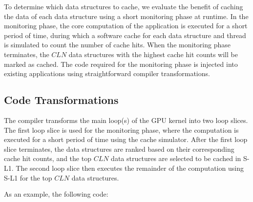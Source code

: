 To determine which data structures to cache, we evaluate the benefit of caching the data of each
data structure using a short monitoring phase at runtime.
In the monitoring phase, the core computation of the application is executed for a short period of
time, during which a software cache for each data structure and thread is simulated to count the number of cache hits.
When the monitoring phase terminates, the $CLN$ data structures with the highest cache hit counts
will be marked as cached. 
The code required for the monitoring phase is injected into existing applications using straightforward
compiler transformations. 




\subsection{Code Transformations}
The compiler transforms the main loop(s) of the GPU kernel into two loop slices. 
The first loop slice is used for the monitoring phase, where the computation is executed for a short
period of time using the cache simulator.
After the first loop slice terminates, the data structures are ranked based on their corresponding
cache hit counts, and the top $CLN$ data structures are selected to be cached in S-L1. 
The second loop slice then executes the remainder of the computation using S-L1 for the top $CLN$
data structures.

As an example, the following code:

{\scriptsize
\begin{flushleft}
\verb%  //Some initialization%
\\ \verb%  for(int i = start; i < end; i ++) {%
\\ \verb%       char a = charInput[i];%
\\ \verb%       int b = intInput[i];%
\\ \verb%   %
\\ \verb%       int e = doComputation(a, b);%
\\ \verb%       intOutput[i] = e;%
\\ \verb%  }%
\\ \verb%  //Some final computation%
\end{flushleft}
}

